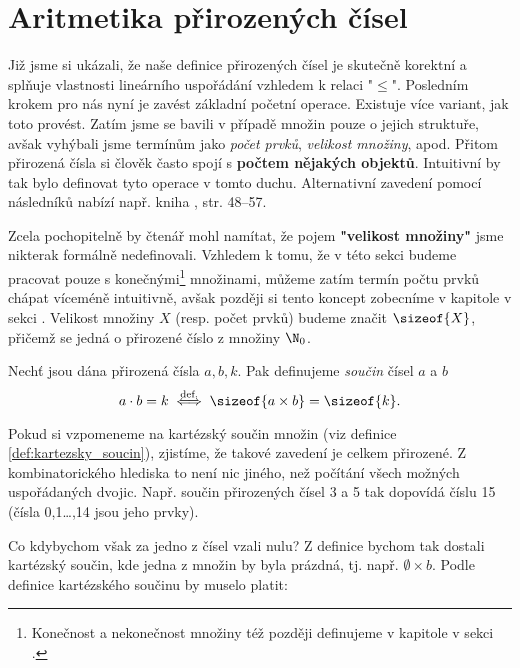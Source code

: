 \section{Aritmetika přirozených čísel}\label{sec:aritmetika_prirozenych_cisel}
Již jsme si ukázali, že naše definice přirozených čísel je skutečně korektní a splňuje vlastnosti lineárního uspořádání vzhledem k relaci "$\leq$". Posledním krokem pro nás nyní je zavést základní početní operace. Existuje více variant, jak toto provést. Zatím jsme se bavili v případě množin pouze o jejich struktuře, avšak vyhýbali jsme termínům jako \emph{počet prvků}, \emph{velikost množiny}, apod. Přitom přirozená čísla si člověk často spojí s \textbf{počtem nějakých objektů}. Intuitivní by tak bylo definovat tyto operace v tomto duchu. Alternativní zavedení pomocí následníků nabízí např. kniha \cite{Goldrei2017}, str. 48--57.\par
Zcela pochopitelně by čtenář mohl namítat, že pojem \textbf{"velikost množiny"} jsme nikterak formálně nedefinovali. Vzhledem k tomu, že v této sekci budeme pracovat pouze s konečnými\footnote{Konečnost a nekonečnost množiny též později definujeme v kapitole  v sekci .} množinami, můžeme zatím termín počtu prvků chápat víceméně intuitivně, avšak později si tento koncept zobecníme v kapitole  v sekci . Velikost množiny $X$ (resp. počet prvků) budeme značit $\sizeof{X}$, přičemž se jedná o přirozené číslo z množiny $\N_0$.\par
\begin{definition}\label{def:soucin_pritozenych_cisel}
    Nechť jsou dána přirozená čísla $a,b,k$. Pak definujeme \emph{součin} čísel $a$ a $b$
    \begin{equation*}
        a\cdot b=k\stackrel{\text{def.}}{\iff} \sizeof{a\times b}=\sizeof{k}.
    \end{equation*}
\end{definition}
Pokud si vzpomeneme na kartézský součin množin (viz definice \ref{def:kartezsky_soucin}), zjistíme, že takové zavedení je celkem přirozené. Z kombinatorického hlediska to není nic jiného, než počítání všech možných uspořádaných dvojic. Např. součin přirozených čísel 3 a 5 tak dopovídá číslu 15 (čísla 0,1\dots,14 jsou jeho prvky).\par
Co kdybychom však za jedno z čísel vzali nulu? Z definice bychom tak dostali kartézský součin, kde jedna z množin by byla prázdná, tj. např. $\emptyset\times b$. Podle definice kartézského součinu by muselo platit:
